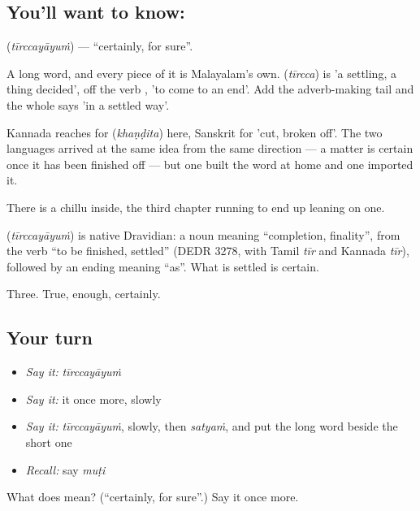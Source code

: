 \subsection*{You'll want to know: }
\textbf{} (\emph{tīrccayāyuṁ}) — \textquotedblleft{}certainly, for sure\textquotedblright{}.

A long word, and every piece of it is Malayalam's own.  (\emph{tīrcca}) is 'a settling, a thing decided', off the verb , 'to come to an end'. Add the adverb-making tail and the whole says 'in a settled way'.

Kannada reaches for  (\emph{khaṇḍita}) here, Sanskrit for 'cut, broken off'. The two languages arrived at the same idea from the same direction — a matter is certain once it has been finished off — but one built the word at home and one imported it.

There is a chillu  inside, the third chapter running to end up leaning on one.

\begin{cousinweb}
\textbf{} (\emph{tīrccayāyuṁ}) is native Dravidian: a noun meaning \textquotedblleft{}completion, finality\textquotedblright{}, from the verb \textquotedblleft{}to be finished, settled\textquotedblright{} (DEDR 3278, with Tamil \emph{tīr} and Kannada \emph{tīr}), followed by an ending meaning \textquotedblleft{}as\textquotedblright{}. What is settled is certain.
\end{cousinweb}

\begin{grammarlens}[title={What you've built}]
Three. True, enough, certainly.
\end{grammarlens}

\subsection*{Your turn}
\begin{itemize}
\raggedright
  \item \emph{Say it:} \emph{tīrccayāyuṁ}
  \item \emph{Say it:} it once more, slowly
  \item \emph{Say it:} \emph{tīrccayāyuṁ}, slowly, then \emph{satyaṁ}, and put the long word beside the short one
  \item \emph{Recall:} say \emph{muṭi}
\end{itemize}

\begin{tcolorbox}[breakable,colback=teal!4,colframe=teal!35!black,title={Before you move on}]
What does  mean? (\textquotedblleft{}certainly, for sure\textquotedblright{}.) Say it once more.
\end{tcolorbox}
